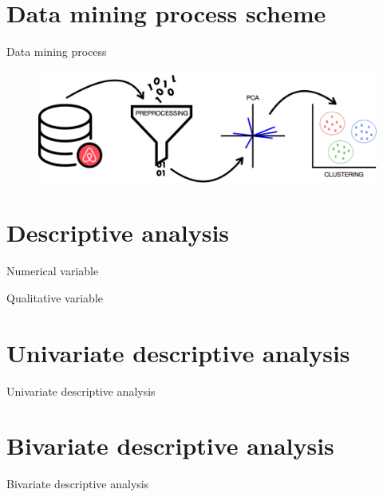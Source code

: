 \section{Data mining process scheme}
\begin{frame}{Data mining process}
\begin{figure}[H]
    \centering
    \includegraphics[width=0.75\linewidth]{../final/images/workflow}
\end{figure}
\end{frame}

\section{Descriptive analysis}
\begin{frame}{Numerical variable}
\vspace{0.7em}
\end{frame}

\begin{frame}{Qualitative variable}
\vspace{1.5em}
\end{frame}


\section{Univariate descriptive analysis}
\begin{frame}{Univariate descriptive analysis}
\end{frame}

\section{Bivariate descriptive analysis}
\begin{frame}{Bivariate descriptive analysis}
\end{frame}

